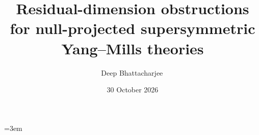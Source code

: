 \documentclass[11pt,a4paper,reqno]{amsart}
\title[Residual-dimension obstructions for null-projected SYM theories]{Residual-dimension obstructions for null-projected supersymmetric Yang--Mills theories}
\author{Deep Bhattacharjee\,\orcidlink{0000-0003-0466-750X}}
\date{30 October 2026}
\numberwithin{equation}{section}
\begin{document}
\begin{abstract}
\itshape

\end{abstract}

\maketitle
\enlargethispage{3pt}



\begingroup\sloppy\emergencystretch=3em

\endgroup
\end{document}
